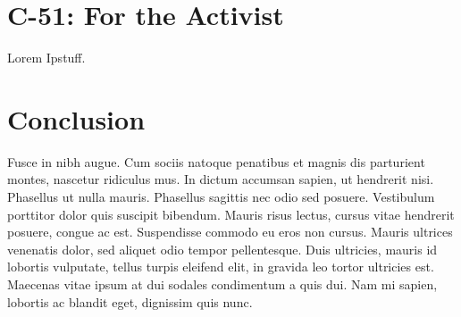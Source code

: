 \documentclass[a4paper, 11pt]{article} %
\begin{document}
\section*{C-51: For the Activist}
Lorem Ipstuff.


\section*{Conclusion}
Fusce in nibh augue. Cum sociis natoque penatibus et magnis dis parturient montes, nascetur ridiculus mus. In dictum accumsan sapien, ut hendrerit nisi. Phasellus ut nulla mauris. Phasellus sagittis nec odio sed posuere. Vestibulum porttitor dolor quis suscipit bibendum. Mauris risus lectus, cursus vitae hendrerit posuere, congue ac est. Suspendisse commodo eu eros non cursus. Mauris ultrices venenatis dolor, sed aliquet odio tempor pellentesque. Duis ultricies, mauris id lobortis vulputate, tellus turpis eleifend elit, in gravida leo tortor ultricies est. Maecenas vitae ipsum at dui sodales condimentum a quis dui. Nam mi sapien, lobortis ac blandit eget, dignissim quis nunc.







\end{document}
